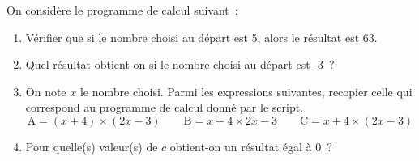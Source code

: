 \documentclass[exercice]{thedocument}%
\begin{document}
%
On considère le programme de calcul suivant~:\par
\begin{center}
\end{center}
\begin{enumerate}
    \item Vérifier que si le nombre choisi au départ est 5, alors le résultat est 63.
    \item Quel résultat obtient-on si le nombre choisi au départ est -3~?
    \item On note $x$ le nombre choisi. Parmi les expressions suivantes, recopier celle
    qui correspond au programme de calcul donné par le script.
    $$\text{A}=(x+4)\times(2x-3)\qquad\text{B}=x+4\times2x-3\qquad\text{C}=x+4\times(2x-3)$$
    \item Pour quelle(s) valeur(s) de $c$ obtient-on un résultat égal à 0~?
\end{enumerate}
\showthesource
\end{document}
